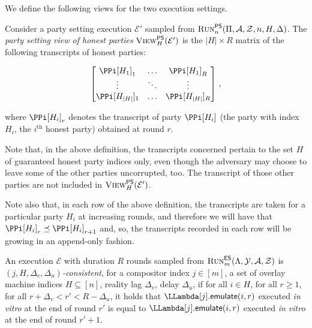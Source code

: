 We define the following views for the two execution settings.

\begin{definition}
  Consider a party setting execution $\mathcal{E}'$ sampled from
  $\textsc{Run}^{\textsf{PS}}_n(\Pi, \mathcal{A}, \mathcal{Z}, n, H, \Delta)$.
  The \emph{party setting view of honest parties} $\textsc{View}^{\textsf{PS}}_H(\mathcal{E}')$
  is the $|H|\times R$ matrix of the following transcripts of honest parties:

  \[
  \begin{bmatrix}
    \PPi[H_1]_1 &\ldots& \PPi[H_1]_R\\
         \vdots &\ddots& \vdots     \\
    \PPi[H_{|H|}]_1 &\ldots& \PPi[H_{|H|}]_R
  \end{bmatrix}\,,
  \]

  where $\PPi[H_i]_r$ denotes the transcript of party $\PPi[H_i]$
  (the party with index $H_i$, the $i^\text{th}$ honest party)
  obtained at round $r$.
\end{definition}

Note that, in the above definition, the transcripts concerned pertain to the
set $H$ of guaranteed honest party indices only, even though the adversary may choose
to leave some of the other parties uncorrupted, too. The transcript of
those other parties are not included in $\textsc{View}^{\textsf{PS}}_H(\mathcal{E}')$.

Note also that, in each row of the above definition, the transcripts
are taken for a particular party $H_i$ at increasing rounds, and therefore
we will have that $\PPi[H_i]_r \preceq \PPi[H_i]_{r+1}$ and, so, the transcripts
recorded in each row will be growing in an append-only fashion.

\begin{definition}
  An execution $\mathcal{E}$ with duration $R$ rounds sampled from
  $\textsc{Run}^{\textsf{ES}}_m(\Lambda, \mathcal{Y}, \mathcal{A}, \mathcal{Z})$
  is \emph{$(j,H,\Delta_v,\Delta_u)$-\emph{consistent}},
  for a compositor index $j \in [m]$,
  a set of overlay machine indices $H \subseteq [n]$,
  reality lag $\Delta_v$,
  delay $\Delta_u$,
  if
  for all $i \in H$, for all $r \geq 1$,
  for all $r + \Delta_v < r' < R - \Delta_u$,
  it holds that
  $\LLambda[j].\emulateMachine(i, r)$ executed \emph{in vitro} at the end of round $r'$
  is equal to
  $\LLambda[j].\emulateMachine(i, r)$ executed \emph{in vitro} at the end of round $r' + 1$.
\end{definition}

